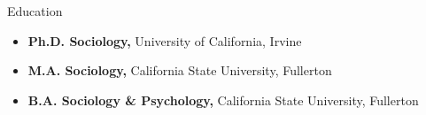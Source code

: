 \documentclass{resume} %
\newenvironment{hangt}[1]
 {\par\vspace{-\parsep}%
  \begin{itemize}[label={#1\ \quad},leftmargin=*,labelsep=0pt]
  \raggedright
  \item\relax
  \vspace*{8pt}
  }
 {\end{itemize}}
\newcommand{\datefill}{\quad \hspace{12pt}}
\begin{document}
\begin{rSection}{Education}

\begin{hangt}{2019 \datefill}
{\bf Ph.D. Sociology,} University of California, Irvine \vspace*{-.75em} 
\end{hangt}
\begin{hangt}{2012 \datefill}
{\bf M.A. Sociology,} California State University, Fullerton \vspace*{-.75em} 
\end{hangt}
\begin{hangt}{2010 \datefill}
{\bf B.A. Sociology \& Psychology,} California State University, Fullerton 
\end{hangt}


\end{rSection}




\end{document}
